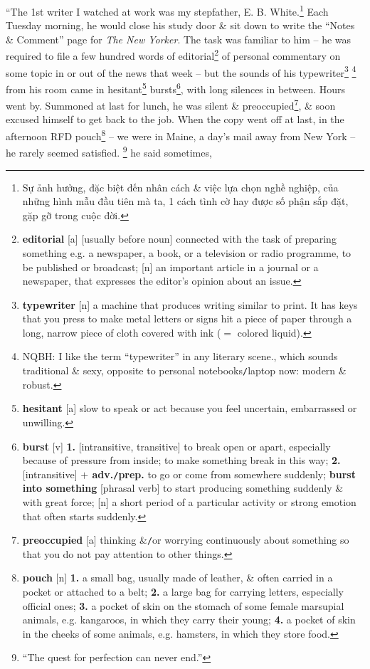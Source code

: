 \documentclass{article}
\begin{document}
``The 1st writer I watched at work was my stepfather, E. B. White.\footnote{Sự ảnh hưởng, đặc biệt đến nhân cách \& việc lựa chọn nghề nghiệp, của những hình mẫu đầu tiên mà ta, 1 cách tình cờ hay được số phận sắp đặt, gặp gỡ trong cuộc đời.} Each Tuesday morning, he would close his study door \& sit down to write the ``Notes \& Comment'' page for {\it The New Yorker}. The task was familiar to him -- he was required to file a few hundred words of editorial\footnote{{\bf editorial} [a] [usually before noun] connected with the task of preparing something e.g. a newspaper, a book, or a television or radio programme, to be published or broadcast; [n] an important article in a journal or a newspaper, that expresses the editor's opinion about an issue.} of personal commentary on some topic in or out of the news that week -- but the sounds of his typewriter\footnote{{\bf typewriter} [n] a machine that produces writing similar to print. It has keys that you press to make metal letters or signs hit a piece of paper through a long, narrow piece of cloth covered with ink ($=$ colored liquid).} \footnote{NQBH: I like the term ``typewriter'' in any literary scene., which sounds traditional \& sexy, opposite to personal notebooks{\tt/}laptop now: modern \& robust.} from his room came in hesitant\footnote{{\bf hesitant} [a] slow to speak or act because you feel uncertain, embarrassed or unwilling.} bursts\footnote{{\bf burst} [v] {\bf 1.} [intransitive, transitive] to break open or apart, especially because of pressure from inside; to make something break in this way; {\bf 2.} [intransitive] {\bf $+$ adv.{\tt/}prep.} to go or come from somewhere suddenly; {\bf burst into something} [phrasal verb] to start producing something suddenly \& with great force; [n] a short period of a particular activity or strong emotion that often starts suddenly.}, with long silences in between. Hours went by. Summoned at last for lunch, he was silent \& preoccupied\footnote{{\bf preoccupied} [a] thinking \&{\tt/}or worrying continuously about something so that you do not pay attention to other things.}, \& soon excused himself to get back to the job. When the copy went off at last, in the afternoon RFD pouch\footnote{{\bf pouch} [n] {\bf 1.} a small bag, usually made of leather, \& often carried in a pocket or attached to a belt; {\bf 2.} a large bag for carrying letters, especially official ones; {\bf 3.} a pocket of skin on the stomach of some female marsupial animals, e.g. kangaroos, in which they carry their young; {\bf 4.} a pocket of skin in the cheeks of some animals, e.g. hamsters, in which they store food.} -- we were in Maine, a day's mail away from New York -- he rarely seemed satisfied. \footnote{``The quest for perfection can never end.''} he said sometimes, 
\end{document}
